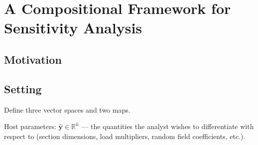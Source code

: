 \newcommand{\haty}{\hat{\bm{y}}}
\newcommand{\corey}{\bm{y}}
\newcommand{\nhost}{\hat{n}}
\newcommand{\ncore}{n}
\newcommand{\nstate}{m}

\newcommand{\Ymap}{\mathcal{Y}}   %
\newcommand{\Mmap}{\mathcal{M}}   %
\newcommand{\Tmap}{\mathcal{T}}   %

\section{A Compositional Framework for Sensitivity Analysis}

\subsection{Motivation}

\subsection{Setting}
Define three vector spaces and two maps.

  Host parameters:   $\haty \in \mathbb{R}^{\nhost}$
      — the quantities the analyst wishes to differentiate with
        respect to (section dimensions, load multipliers, random
        field coefficients, etc.).

